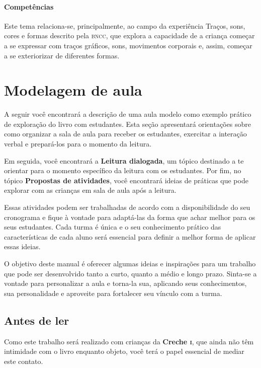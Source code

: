 \documentclass[11pt]{extarticle}
\begin{document}
\paragraph{Competências} Este tema relaciona-se, principalmente, ao 
campo da experiência Traços, sons, cores e formas
descrito pela \textsc{bncc}, que explora a capacidade de a criança começar a se expressar com traços gráficos, sons, movimentos corporais e, assim, começar a se exteriorizar de diferentes formas.


\section{Modelagem de aula}
A seguir você encontrará a descrição de uma aula modelo como exemplo 
prático de exploração do livro com estudantes. Esta seção apresentará 
orientações sobre como organizar a sala de aula para receber os 
estudantes, exercitar a interação verbal e prepará-los para o 
momento da leitura.

Em seguida, você encontrará a \textbf{Leitura dialogada}, um 
tópico destinado a te orientar para o momento específico da 
leitura com os estudantes. Por fim, no tópico 
\textbf{Propostas de atividades}, você encontrará ideias 
de práticas que pode explorar com as crianças em sala de 
aula após a leitura. 

Essas atividades podem ser trabalhadas de acordo com a 
disponibilidade do seu cronograma e fique à vontade para adaptá-las 
da forma que achar melhor para os seus estudantes. Cada turma é única 
e o seu conhecimento prático das características de cada aluno será 
essencial para definir a melhor forma de aplicar essas ideias. 

O objetivo deste manual é oferecer algumas ideias 
e inspirações para um trabalho que pode ser desenvolvido tanto 
a curto, quanto a médio e longo prazo. Sinta-se a vontade para 
personalizar a aula e torna-la sua, aplicando seus conhecimentos, sua 
personalidade e aproveite para fortalecer 
seu vínculo com a turma.


\subsection{Antes de ler}


Como este trabalho será realizado com crianças da \textbf{Creche \textsc{i}}, 
que ainda não têm intimidade com o livro enquanto objeto, você terá o 
papel essencial de mediar este contato. 
\end{document}

